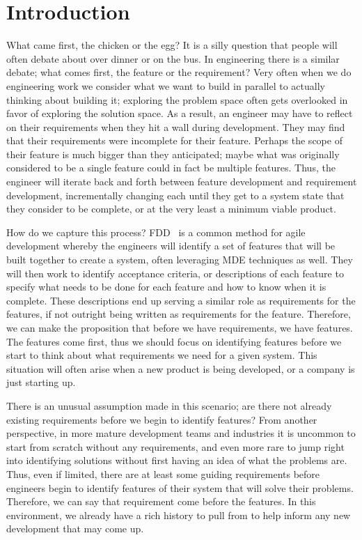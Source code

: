 \chapter{Introduction}

What came first, the chicken or the egg? It is a silly question that people will often debate about over dinner or on the bus. In engineering there is a similar debate; what comes first, the feature or the requirement? Very often when we do engineering work we consider what we want to build in parallel to actually thinking about building it; exploring the problem space often gets overlooked in favor of exploring the solution space. As a result, an engineer may have to reflect on their requirements when they hit a wall during development. They may find that their requirements were incomplete for their feature. Perhaps the scope of their feature is much bigger than they anticipated; maybe what was originally considered to be a single feature could in fact be multiple features. Thus, the engineer will iterate back and forth between feature development and requirement development, incrementally changing each until they get to a system state that they consider to be complete, or at the very least a minimum viable product. 

How do we capture this process? \ac{FDD}~\cite{palmer2001practical} is a common method for agile development whereby the engineers will identify a set of features that will be built together to create a system, often leveraging \ac{MDE} techniques as well. They will then work to identify acceptance criteria, or descriptions of each feature to specify what needs to be done for each feature and how to know when it is complete. These descriptions end up serving a similar role as requirements for the features, if not outright being written as requirements for the feature. Therefore, we can make the proposition that before we have requirements, we have features. The features come first, thus we should focus on identifying features before we start to think about what requirements we need for a given system. This situation will often arise when a new product is being developed, or a company is just starting up.

There is an unusual assumption made in this scenario; are there not already existing requirements before we begin to identify features? From another perspective, in more mature development teams and industries it is uncommon to start from scratch without any requirements, and even more rare to jump right into identifying solutions without first having an idea of what the problems are. Thus, even if limited, there are at least some guiding requirements before engineers begin to identify features of their system that will solve their problems. Therefore, we can say that requirement come before the features. In this environment, we already have a rich history to pull from to help inform any new development that may come up.

